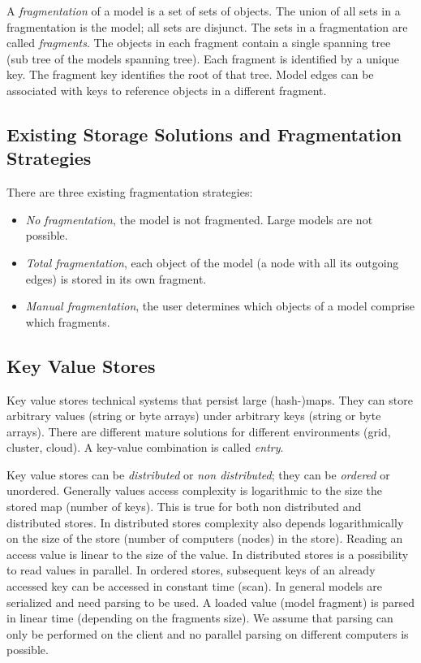 A \emph{fragmentation} of a model is a set of sets of objects. The union of all sets in a fragmentation is the model; all sets are disjunct. The sets in a fragmentation are called \emph{fragments}. The objects in each fragment contain a single spanning tree (sub tree of the models spanning tree). Each fragment is identified by a unique key. The fragment key identifies the root of that tree. Model edges can be associated with keys to reference objects in a different fragment.  

\subsection{Existing Storage Solutions and Fragmentation Strategies}

There are three existing fragmentation strategies:
\begin{itemize}

\item \emph{No fragmentation}, the model is not fragmented. Large models are not possible.
\item \emph{Total fragmentation}, each object of the model (a node with all its outgoing edges) is stored in its own fragment.
\item \emph{Manual fragmentation}, the user determines which objects of a model comprise which fragments.
\end{itemize} 

\subsection{Key Value Stores}

Key value stores technical systems that persist large (hash-)maps. They can store arbitrary values (string or byte arrays) under arbitrary keys (string or byte arrays). There are different mature solutions for different environments (grid, cluster, cloud). A key-value combination is called \emph{entry}.

Key value stores can be \emph{distributed} or \emph{non distributed}; they can be \emph{ordered} or {unordered}. Generally values access complexity is logarithmic to the size the stored map (number of keys). This is true for both non distributed and distributed stores. In distributed stores complexity also depends logarithmically on the size of the store (number of computers (nodes) in the store). Reading an access value is linear to the size of the value. In distributed stores is a possibility to read values in parallel. In ordered stores, subsequent keys of an already accessed key can be accessed in constant time (scan). In general models are serialized and need parsing to be used. A loaded value (model fragment) is parsed in linear time (depending on the fragments size). We assume that parsing can only be performed on the client and no parallel parsing on different computers is possible. 

